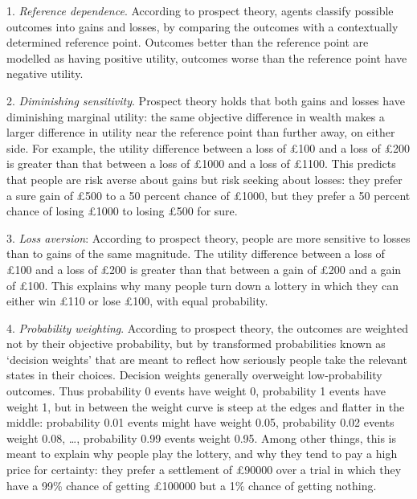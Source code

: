 1. \emph{Reference dependence}. According to prospect theory, agents classify
possible outcomes into gains and losses, by comparing the outcomes with a
contextually determined reference point. Outcomes better than the reference
point are modelled as having positive utility, outcomes worse than the reference
point have negative utility.

2. \emph{Diminishing sensitivity}. Prospect theory holds that both gains and
losses have diminishing marginal utility: the same objective difference in
wealth makes a larger difference in utility near the reference point than
further away, on either side. For example, the utility difference between a loss
of £100 and a loss of £200 is greater than that between a loss of £1000 and a
loss of £1100. This predicts that people are risk averse about gains but risk
seeking about losses: they prefer a sure gain of £500 to a 50 percent chance of
£1000, but they prefer a 50 percent chance of losing £1000 to losing £500 for
sure.

3. \emph{Loss aversion}: According to prospect theory, people are more sensitive
to losses than to gains of the same magnitude. The utility difference between a
loss of £100 and a loss of £200 is greater than that between a gain of £200 and
a gain of £100. This explains why many people turn down a lottery in which they
can either win £110 or lose £100, with equal probability.

4. \emph{Probability weighting}. According to prospect theory, the outcomes are
weighted not by their objective probability, but by transformed probabilities
known as `decision weights' that are meant to reflect how seriously people take
the relevant states in their choices. Decision weights generally overweight
low-probability outcomes. Thus probability 0 events have weight 0, probability 1
events have weight 1, but in between the weight curve is steep at the edges and
flatter in the middle: probability 0.01 events might have weight 0.05,
probability 0.02 events weight 0.08, \ldots, probability 0.99 events weight
0.95. Among other things, this is meant to explain why people play the lottery,
and why they tend to pay a high price for certainty: they prefer a settlement of
£90000 over a trial in which they have a 99\% chance of getting £100000 but a
1\% chance of getting nothing.%

